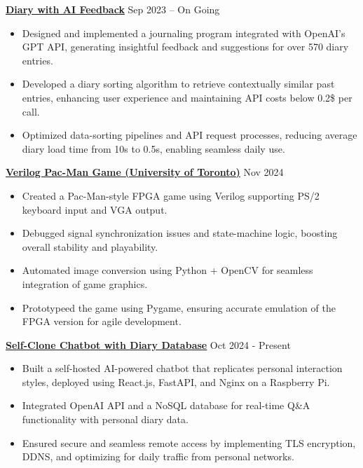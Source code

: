 \documentclass[a4paper,10pt]{article}
\begin{document}
\noindent\href{https://github.com/Ken-2511/Diary-with-ChatGPT-Comment}{\uline{
\textbf{Diary with AI Feedback}}} \hfill Sep 2023 -- On Going
\begin{itemize}[leftmargin=0.2in]
    \item Designed and implemented a journaling program integrated with OpenAI’s GPT API, generating insightful feedback and suggestions for over 570 diary entries.
    \item Developed a diary sorting algorithm to retrieve contextually similar past entries, enhancing user experience and maintaining API costs below 0.2\$ per call.
    \item Optimized data-sorting pipelines and API request processes, reducing average diary load time from 10s to 0.5s, enabling seamless daily use.
\end{itemize}


\vspace{0.3cm}
\noindent\href{https://github.com/Ken-2511/ECE241-Project}{\uline{
\textbf{Verilog Pac-Man Game (University of Toronto)}}} \hfill Nov 2024
\begin{itemize}[leftmargin=0.2in]
    \item Created a Pac-Man-style FPGA game using Verilog supporting PS/2 keyboard input and VGA output.
    \item Debugged signal synchronization issues and state-machine logic, boosting overall stability and playability.
    \item Automated image conversion using Python + OpenCV for seamless integration of game graphics.
    \item Prototypeed the game using Pygame, ensuring accurate emulation of the FPGA version for agile development.
\end{itemize}

\vspace{0.3cm}
\noindent\href{https://chengyongkang.me/chat}{\uline{
\textbf{Self-Clone Chatbot with Diary Database}}} \hfill Oct 2024 - Present
\begin{itemize}[leftmargin=0.2in]
    \item Built a self-hosted AI-powered chatbot that replicates personal interaction styles, deployed using React.js, FastAPI, and Nginx on a Raspberry Pi.
    \item Integrated OpenAI API and a NoSQL database for real-time Q\&A functionality with personal diary data.
    \item Ensured secure and seamless remote access by implementing TLS encryption, DDNS, and optimizing for daily traffic from personal networks.
\end{itemize}
\end{document}
